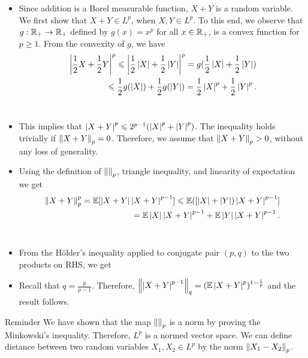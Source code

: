 \documentclass[12pt,aspectratio=169]{beamer}
\begin{document}
\begin{frame}
\begin{Proof}
\begin{itemize}
\item <1-> Since addition is a Borel measurable function, $X+Y$ is a random variable. 
We first show that $X+Y \in L^p$, when $X,Y \in L^p$.  
To this end, we observe that $g:\mathbb{R}_+\to\mathbb{R}_+$ defined by $g(x)= x^p$ for all $x \in \mathbb{R}_+$, 
is a convex function for $p \ge 1$. 
From the convexity of $g$, we have 
\begin{align}
\left\lvert\frac{1}{2}X + \frac{1}{2}Y\right\rvert^p 
\leqslant \left\lvert\frac{1}{2}\left\lvert X\right\rvert + \frac{1}{2}\left\lvert Y\right\rvert\right\rvert^p
= g(\frac{1}{2}\left\lvert X\right\rvert + \frac{1}{2}\left\lvert Y\right\rvert)\notag \\
\leqslant \frac{1}{2}g(\left\lvert X\right\rvert) + \frac{1}{2}g(\left\lvert Y\right\rvert) = \frac{1}{2}\left\lvert X\right\rvert^p + \frac{1}{2}\left\lvert Y\right\rvert^p. \notag
\end{align}\\
\item <2-> This implies that $\left\lvert X+Y\right\rvert^p \leqslant 2^{p-1}(\left\lvert X\right\rvert^p + \left\lvert Y\right\rvert^p)$. 
The inequality holds trivially if $\left\lVert X+Y\right\rVert_p = 0$. 
Therefore, we assume that $\left\lVert X+Y\right\rVert_p > 0$, without any loss of generality. 
\end{itemize}
\end{Proof}
\end{frame}

\begin{frame}
\begin{Proof}
\begin{itemize}
\item <1-> Using the definition of $\left\lVert\right\rVert_p$, triangle inequality, 
and linearity of expectation 
we get 
\begin{align}
\left\lVert X+Y\right\rVert_p^p 
= \mathbb{E}[\left\lvert X+Y\right\rvert\left\lvert X+Y\right\rvert^{p-1}] \leqslant \mathbb{E}([\left\lvert X\right\rvert+\left\lvert Y\right\rvert)\left\lvert X+Y\right\rvert^{p-1}] \notag \\
= \mathbb{E}\left\lvert X\right\rvert\left\lvert X+Y\right\rvert^{p-1} +  \mathbb{E}\left\lvert Y\right\rvert\left\lvert X+Y\right\rvert^{p-1}. \notag
\end{align}\\
\item <2-> From the H\"older's inequality applied to conjugate pair $(p,q)$ to the two products on RHS, we get 
\item <3-> Recall that $q = \frac{p}{p-1}$. %
Therefore, $\left\lVert\left\lvert X+Y\right\rvert^{p-1}\right\rVert_q = (\mathbb{E}\left\lvert X+Y\right\rvert^p)^{1-\frac{1}{p}}$ and the result follows.
\end{itemize}
\end{Proof}
\end{frame}
\begin{frame}
\begin{block}{Reminder}
We have shown that the map $\left\lVert\right\rVert_p$ is a norm by proving the Minkowski's inequality. 
Therefore, $L^p$ is a normed vector space.    
We can define distance between two random variables $X_1, X_2 \in L^p$ by the norm $\left\lVert X_1-X_2\right\rVert_p$. 
\end{block}
\end{frame}
\end{document}
